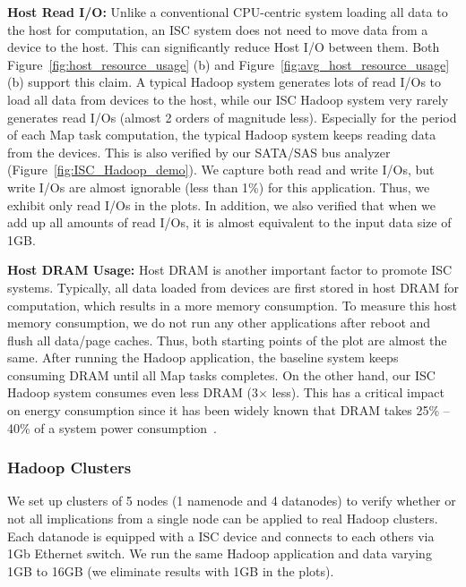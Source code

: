 \textbf{Host Read I/O:} Unlike a conventional CPU-centric system loading all data to the host for computation, an ISC system does not need to move data from a device to the host. This can significantly reduce Host I/O between them. Both Figure~\ref{fig:host_resource_usage} (b) and Figure~\ref{fig:avg_host_resource_usage} (b) support this claim. A typical Hadoop system generates lots of read I/Os to load all data from devices to the host, while our ISC Hadoop system very rarely generates read I/Os (almost 2 orders of magnitude less). Especially for the period of each Map task computation, the typical Hadoop system keeps reading data from the devices. This is also verified by our SATA/SAS bus analyzer (Figure~\ref{fig:ISC_Hadoop_demo}). We capture both read and write I/Os, but write I/Os are almost ignorable (less than 1\%) for this application. Thus, we exhibit only read I/Os in the plots. In addition, we also verified that when we add up all amounts of read I/Os, it is almost equivalent to the input data size of 1GB.






\textbf{Host DRAM Usage:} Host DRAM is another important factor to promote ISC systems. Typically, all data loaded from devices are first stored in host DRAM for computation, which results in a more memory consumption. To measure this host memory consumption, we do not run any other applications after reboot and flush all data/page caches. Thus, both starting points of the plot are almost the same. After running the Hadoop application, the baseline system keeps consuming DRAM until all Map tasks completes. On the other hand, our ISC Hadoop system consumes even less DRAM (3$\times$ less). This has a critical impact on energy consumption since it has been widely known that DRAM takes 25\% -- 40\% of a system power consumption~\cite{DRAM_Power:ISCA:2010,NewServerArch:ISCA:2008,PowerNap:ASPLOS:2009,DisaggregatedMem:ISCA:2009}.







\subsubsection{Hadoop Clusters}\label{subsubsec:Exp_result_clusters}
We set up clusters of 5 nodes (1 namenode and 4 datanodes) to verify whether or not all implications from a single node can be applied to real Hadoop clusters. Each datanode is equipped with a ISC device and connects to each others via 1Gb Ethernet switch. 
We run the same Hadoop application and data varying 1GB to 16GB (we eliminate results with 1GB in the plots). 

